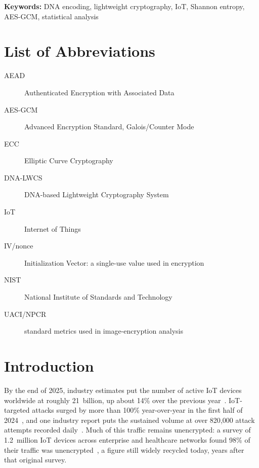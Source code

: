 \documentclass[12pt,a4paper,twoside]{report}
\numberwithin{equation}{chapter}
\begin{document}
\textbf{Keywords:} DNA encoding, lightweight cryptography, IoT, Shannon
entropy, AES-GCM, statistical analysis

\tableofcontents

\chapter*{List of Abbreviations}

\begin{description}
  \item[AEAD] Authenticated Encryption with Associated Data
  \item[AES-GCM] Advanced Encryption Standard, Galois/Counter Mode
  \item[ECC] Elliptic Curve Cryptography
  \item[DNA-LWCS] DNA-based Lightweight Cryptography System
  \item[IoT] Internet of Things
  \item[IV/nonce] Initialization Vector: a single-use value used in encryption
  \item[NIST] National Institute of Standards and Technology
  \item[UACI/NPCR] standard metrics used in image-encryption analysis
\end{description}

\chapter{Introduction}
\label{ch:intro}


By the end of 2025, industry estimates put the number of active IoT
devices worldwide at roughly 21~billion, up about 14\% over the
previous year~\cite{iotanalytics2025}. IoT-targeted attacks surged by
more than 100\% year-over-year in the first half of
2024~\cite{sonicwall2024}, and one industry report puts the sustained
volume at over 820{,}000 attack attempts recorded
daily~\cite{stationx2026}. Much of this traffic remains unencrypted: a
survey of 1.2~million IoT devices across enterprise and healthcare
networks found 98\% of their traffic was unencrypted~\cite{unit42-2020},
a figure still widely recycled today, years after that original survey.
\end{document}
